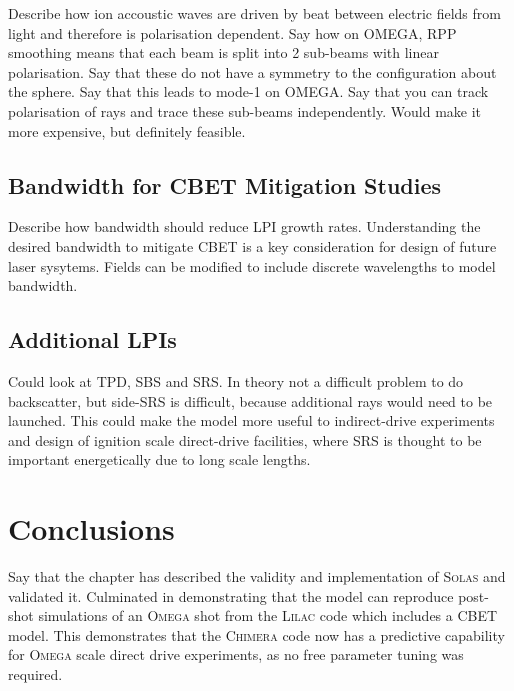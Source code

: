 Describe how ion accoustic waves are driven by beat between electric fields from light and therefore is polarisation dependent.
Say how on OMEGA, RPP smoothing means that each beam is split into 2 sub-beams with linear polarisation.
Say that these do not have a symmetry to the configuration about the sphere.
Say that this leads to mode-1 on OMEGA.
Say that you can track polarisation of rays and trace these sub-beams independently.
Would make it more expensive, but definitely feasible.

\subsection{Bandwidth for CBET Mitigation Studies}

Describe how bandwidth should reduce LPI growth rates.
Understanding the desired bandwidth to mitigate CBET is a key consideration for design of future laser sysytems.
Fields can be modified to include discrete wavelengths to model bandwidth.

\subsection{Additional LPIs}

Could look at TPD, SBS and SRS.
In theory not a difficult problem to do backscatter, but side-SRS is difficult, because additional rays would need to be launched.
This could make the model more useful to indirect-drive experiments and design of ignition scale direct-drive facilities, where SRS is thought to be important energetically due to long scale lengths.



\section{Conclusions}

Say that the chapter has described the validity and implementation of \textsc{Solas} and validated it.
Culminated in demonstrating that the model can reproduce post-shot simulations of an \textsc{Omega} shot from the \textsc{Lilac} code which includes a CBET model.
This demonstrates that the \textsc{Chimera} code now has a predictive capability for \textsc{Omega} scale direct drive experiments, as no free parameter tuning was required.
